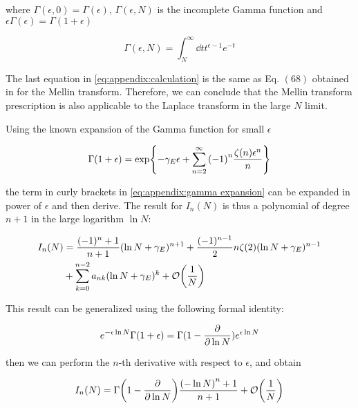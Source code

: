 \documentclass[../main.tex]{subfiles}
\begin{document}
where $\Gamma(\epsilon,0) = \Gamma(\epsilon)$, $\Gamma(\epsilon,N)$ is the incomplete Gamma function and $\epsilon \Gamma(\epsilon)=\Gamma(1+\epsilon)$

\begin{equation}
    \Gamma(\epsilon,N) = \int_N^\infty \dd{t} t^{\epsilon-1} e^{-t}
\end{equation}

The last equation in \cref{eq:appendix:calculation} is the same as Eq. $(68)$ obtained in \cite{Catani_2003_appendix} for the Mellin transform. Therefore, 
we can conclude that the Mellin transform prescription is also applicable to the Laplace transform in the large $N$ limit.

Using the known expansion of the Gamma function for small $\epsilon$ 

\begin{equation}\label{eq:appendix:gamma expansion}
    \Gamma(1+\epsilon) = \exp{-\gamma_E \epsilon + \sum_{n=2}^\infty \qty(-1)^n \frac{\zeta(n) \epsilon^n}{n}}
\end{equation}

the term in curly brackets in \cref{eq:appendix:gamma expansion} can be expanded in power of $\epsilon$ and then derive. The result for $I_n(N)$ is thus a 
polynomial of degree $n+1$ in the large logarithm $\ln N$:

\begin{align}
    \begin{split}\label{eq:appendix:In expansion}    
        I_n(N) &= \frac{(-1)^n+1}{n+1} (\ln N + \gamma_E)^{n+1} + \frac{(-1)^{n-1}}{2} n \zeta(2) (\ln N + \gamma_E)^{n-1} \\
        &+ \sum_{k=0}^{n-2} a_{nk} (\ln N + \gamma_E)^k +\order{\frac{1}{N}}
    \end{split}
\end{align}

This result can be generalized using the following formal identity:

\begin{equation}
    e^{-\epsilon \ln N} \Gamma(1+\epsilon) = \Gamma(1- \pdv{\ln N}) e^{\epsilon \ln N }
\end{equation}

then we can perform the $n$-th derivative with respect to $\epsilon$, and obtain

\begin{equation}
    I_n(N) = \Gamma\qty(1-\pdv{\ln N}) \frac{ \qty(-\ln N)^n+1}{n+1} + \order{\frac{1}{N}}
\end{equation}
\end{document}
